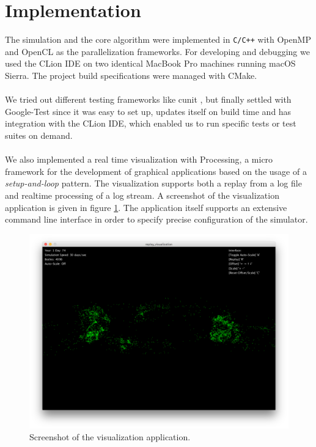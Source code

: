 \documentclass[a4paper,11pt]{scrartcl} %
\begin{document}
\section{Implementation}
The simulation and the core algorithm were implemented in \texttt{C/C++} with OpenMP \cite{openmp} and OpenCL \cite{opencl} as the parallelization frameworks. For developing and debugging we used the CLion IDE \cite{clion} on two identical MacBook Pro machines running macOS Sierra. The project build specifications were managed with CMake.\\\\
We tried out different testing frameworks like cunit \cite{cunit}, but finally settled with Google-Test \cite{gtest} since it was easy to set up, updates itself on build time and has integration with the CLion IDE, which enabled us to run specific tests or test suites on demand.\\\\
We also implemented a real time visualization with Processing, a micro framework for the development of graphical applications based on the usage of a \textit{setup-and-loop} pattern. The visualization supports both a replay from a log file and realtime processing of a log stream. A screenshot of the visualization application is given in figure \ref{fig:vis_app}. The application itself supports an extensive command line interface in order to specify precise configuration of the simulator.

\begin{figure}[h!]
  \centering
  \includegraphics[width=\textwidth]{img/visualization.png}
  \caption{Screenshot of the visualization application.}
  \label{fig:vis_app}
\end{figure}
\end{document}
